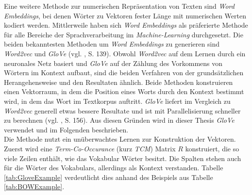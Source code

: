\documentclass[a4paper,11pt]{article}
\begin{document}
Eine weitere Methode zur numerischen Repräsentation von Texten sind \textit{Word Embeddings}, bei denen Wörter zu Vektoren fester Länge mit numerischen Werten kodiert werden. Mittlerweile haben sich \textit{Word Embeddings} als präferierte Methode für alle Bereiche der Sprachverarbeitung im \textit{Machine-Learning} durchgesetzt. Die beiden bekanntesten Methoden um \textit{Word Embeddings} zu generieren sind \textit{Word2vec} und \textit{GloVe} (vgl. \cite{keras}, S. 139). Obwohl \textit{Word2vec} auf dem Lernen durch ein neuronales Netz basiert und \textit{GloVe} auf der Zählung des Vorkommens von Wörtern im Kontext aufbaut, sind die beiden Verfahren von der grundsätzlichen Herangehensweise und den Resultaten ähnlich. Beide Methoden konstruieren einen Vektorraum, in dem die Position eines Worts durch den Kontext bestimmt wird, in dem das Wort im Textkorpus auftritt.
\textit{GloVe} liefert im Vergleich zu \textit{Word2vec} generell etwas bessere Resultate und ist mit Parallelisierung schneller zu berechnen (vgl. \cite{keras}, S. 156). Aus diesen Gründen wird in dieser Thesis \textit{GloVe} verwendet und im Folgenden beschrieben. \\
Die Methode nutzt ein unüberwachtes Lernen zur Konstruktion der Vektoren. Zuerst wird eine \textit{Term-Co-Occurance} (kurz \textit{TCM}) Matrix $R$ konstruiert, die so viele Zeilen enthält, wie das Vokabular Wörter besitzt. Die Spalten stehen auch für die Wörter des Vokabulars, allerdings als Kontext verstanden. Tabelle \ref{tab:GloveExample} verdeutlicht dies anhand des Beispiels aus Tabelle \ref{tab:BOWExample}.
\end{document}
